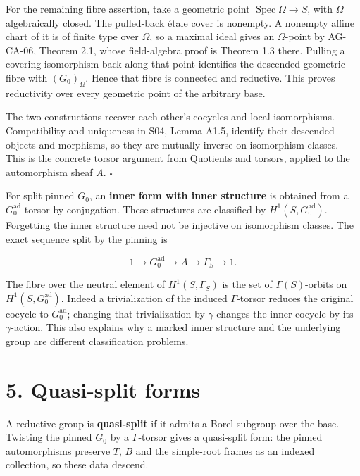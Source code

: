 \documentclass[11pt,a4paper,openany]{report}
\newcounter{none}
\begin{document}
For the remaining fibre assertion, take a geometric point \(\operatorname{Spec}\Omega\to S\), with \(\Omega\) algebraically closed. The pulled-back étale cover is nonempty. A nonempty affine chart of it is of finite type over \(\Omega\), so a maximal ideal gives an \(\Omega\)-point by AG-CA-06, Theorem 2.1, whose field-algebra proof is Theorem 1.3 there. Pulling a covering isomorphism back along that point identifies the descended geometric fibre with \((G_0)_\Omega\). Hence that fibre is connected and reductive. This proves reductivity over every geometric point of the arbitrary base.

The two constructions recover each other's cocycles and local isomorphisms. Compatibility and uniqueness in S04, Lemma A1.5, identify their descended objects and morphisms, so they are mutually inverse on isomorphism classes. This is the concrete torsor argument from \href{https://github.com/KokunoYumeto/open-math-courses/blob/main/docs/courses/AG-GS/AG-GS-04.html}{Quotients and torsors}, applied to the automorphism sheaf \(A\). \(\square\)

For split pinned \(G_0\), an \textbf{inner form with inner structure} is obtained from a \(G_0^{\mathrm{ad}}\)-torsor by conjugation. These structures are classified by \(H^1(S,G_0^{\mathrm{ad}})\). Forgetting the inner structure need not be injective on isomorphism classes. The exact sequence split by the pinning is

\[
1\longrightarrow G_0^{\mathrm{ad}}
\longrightarrow A\longrightarrow\Gamma_S\longrightarrow1.
\tag{4.1}
\]

The fibre over the neutral element of \(H^1(S,\Gamma_S)\) is the set of \(\Gamma(S)\)-orbits on \(H^1(S,G_0^{\mathrm{ad}})\). Indeed a trivialization of the induced \(\Gamma\)-torsor reduces the original cocycle to \(G_0^{\mathrm{ad}}\); changing that trivialization by \(\gamma\) changes the inner cocycle by its \(\gamma\)-action. This also explains why a marked inner structure and the underlying group are different classification problems.

\section{5. Quasi-split forms}\label{AG-RG-06-quasi-split-forms}

A reductive group is \textbf{quasi-split} if it admits a Borel subgroup over the base. Twisting the pinned \(G_0\) by a \(\Gamma\)-torsor gives a quasi-split form: the pinned automorphisms preserve \(T\), \(B\) and the simple-root frames as an indexed collection, so these data descend.
\end{document}
